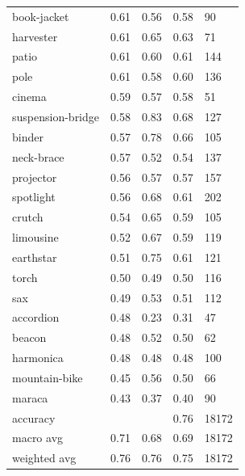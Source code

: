 \begin{center}
\begin{longtable}{lllll}
book-jacket & 0.61 & 0.56 & 0.58 & 90 \\
harvester & 0.61 & 0.65 & 0.63 & 71 \\
patio & 0.61 & 0.60 & 0.61 & 144 \\
pole & 0.61 & 0.58 & 0.60 & 136 \\
cinema & 0.59 & 0.57 & 0.58 & 51 \\
suspension-bridge & 0.58 & 0.83 & 0.68 & 127 \\
binder & 0.57 & 0.78 & 0.66 & 105 \\
neck-brace & 0.57 & 0.52 & 0.54 & 137 \\
projector & 0.56 & 0.57 & 0.57 & 157 \\
spotlight & 0.56 & 0.68 & 0.61 & 202 \\
crutch & 0.54 & 0.65 & 0.59 & 105 \\
limousine & 0.52 & 0.67 & 0.59 & 119 \\
earthstar & 0.51 & 0.75 & 0.61 & 121 \\
torch & 0.50 & 0.49 & 0.50 & 116 \\
sax & 0.49 & 0.53 & 0.51 & 112 \\
accordion & 0.48 & 0.23 & 0.31 & 47 \\
beacon & 0.48 & 0.52 & 0.50 & 62 \\
harmonica & 0.48 & 0.48 & 0.48 & 100 \\
mountain-bike & 0.45 & 0.56 & 0.50 & 66 \\
maraca & 0.43 & 0.37 & 0.40 & 90 \\
\midrule
accuracy &  &  & 0.76 & 18172 \\
macro avg & 0.71 & 0.68 & 0.69 & 18172 \\
weighted avg & 0.76 & 0.76 & 0.75 & 18172 \\
\bottomrule
\end{longtable}
\end{center}
